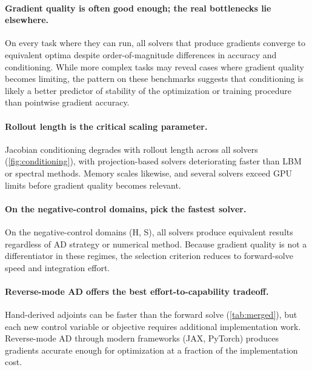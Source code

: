 \documentclass{article}
\begin{document}
\paragraph{Gradient quality is often good enough; the real bottlenecks
lie elsewhere.}
On every task where they can run, all solvers that produce gradients
converge to equivalent optima despite order-of-magnitude differences in
accuracy and conditioning. While more complex tasks may reveal cases
where gradient quality becomes limiting, the pattern on these benchmarks
suggests that conditioning is likely a better predictor of
stability of the optimization or training procedure than pointwise gradient accuracy.

\paragraph{Rollout length is the critical scaling parameter.}
Jacobian conditioning degrades with rollout length across all solvers
(\cref{fig:conditioning}), with projection-based solvers deteriorating
faster than LBM or spectral methods. Memory scales likewise, and
several solvers exceed GPU limits before gradient quality becomes
relevant.

\paragraph{On the negative-control domains, pick the fastest solver.}
On the negative-control domains (H, S), all solvers produce equivalent
results regardless of AD strategy or numerical method. Because gradient
quality is not a differentiator in these regimes, the selection criterion
reduces to forward-solve speed and integration effort.

\paragraph{Reverse-mode AD offers the best effort-to-capability
tradeoff.}
Hand-derived adjoints can be faster than the forward solve
(\cref{tab:merged}), but each new control variable or objective requires
additional implementation work. Reverse-mode AD through modern
frameworks (JAX, PyTorch) produces gradients accurate enough for
optimization at a fraction of the implementation cost.
\end{document}
